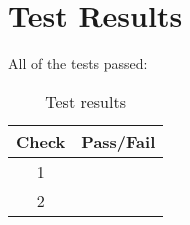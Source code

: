 \section{Test Results}

All of the tests passed:
\begin{table}[H]
	\caption{Test results}
	\label{tab:results}
	\centering \fontsize{10}{10}\selectfont
	\begin{tabular}{c | c  } %
		\hline\hline
		\textbf{Check} 						  		&\textbf{Pass/Fail} \\ 
		\hline
	   1	   			&  \\ 
	   2	   			&  \\ 
	   \hline\hline
	\end{tabular}
\end{table}



